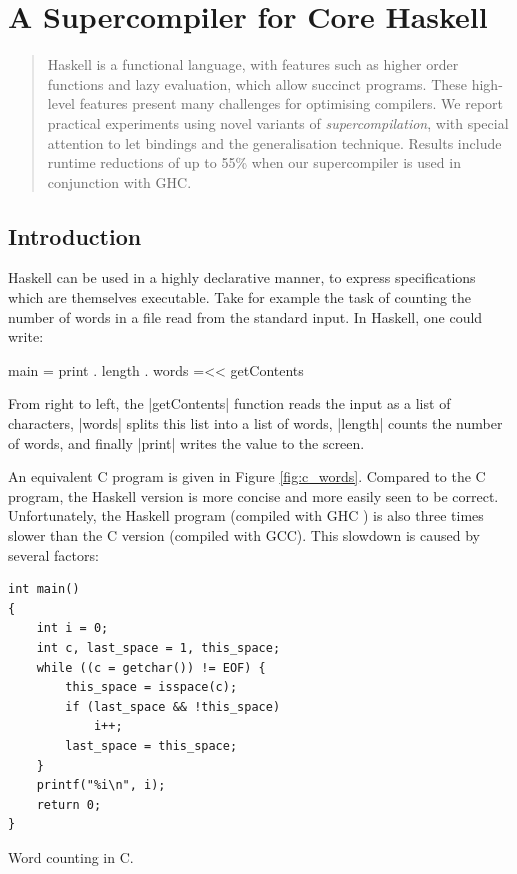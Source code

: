 

\chapter{A Supercompiler for Core Haskell}


\begin{abstract}
Haskell is a functional language, with features such as higher order functions and lazy evaluation, which allow succinct programs. These high-level features present many challenges for optimising compilers. We report practical experiments using novel variants of \textit{supercompilation}, with special attention to let bindings and the generalisation technique. Results include runtime reductions of up to 55\% when our supercompiler is used in conjunction with GHC.
\end{abstract}

\section{Introduction}

Haskell \cite{haskell} can be used in a highly declarative manner, to express specifications which are themselves executable. Take for example the task of counting the number of words in a file read from the standard input. In Haskell, one could write:

\begin{code}
main = print . length . words =<< getContents
\end{code}

From right to left, the |getContents| function reads the input as a list of characters, |words| splits this list into a list of words, |length| counts the number of words, and finally |print| writes the value to the screen.

An equivalent C program is given in Figure \ref{fig:c_words}. Compared to the C program, the Haskell version is more concise and more easily seen to be correct. Unfortunately, the Haskell program (compiled with GHC \cite{ghc}) is also three times slower than the C version (compiled with GCC). This slowdown is caused by several factors:

\begin{fig}
\bigskip
\begin{verbatim}
int main()
{
	int i = 0;
	int c, last_space = 1, this_space;
	while ((c = getchar()) != EOF) {
		this_space = isspace(c);
		if (last_space && !this_space)
			i++;
		last_space = this_space;
	}
	printf("%i\n", i);
	return 0;
}
\end{verbatim}
\figend
\caption{Word counting in C.}
\label{fig:c_words}
\end{fig}

